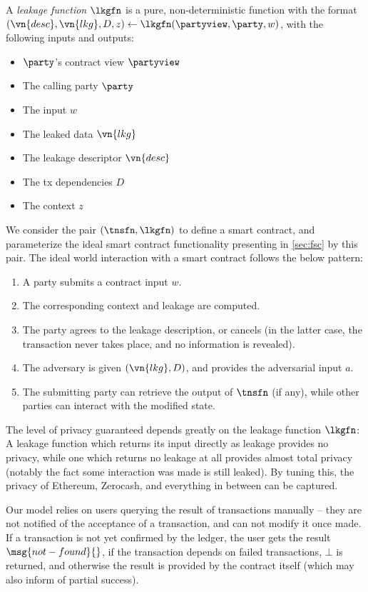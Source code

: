 A \emph{leakage function} $\lkgfn$ is a pure, non-deterministic
function with the format $(\vn{desc}, \vn{lkg}, D, z) \gets
\lkgfn(\partyview,\party, w)$, with the following inputs and outputs:
\vspace{-1em}
\begin{multicols}{2}
\begin{itemize}
  \item $\party$'s contract view $\partyview$
  \item The calling party $\party$
  \item The input $w$
  \item The leaked data $\vn{lkg}$
  \item The leakage descriptor $\vn{desc}$
  \item The tx dependencies $D$
  \item The context $z$
\end{itemize}
\end{multicols}
\vspace{-1em}

We consider the pair $(\tnsfn, \lkgfn)$ to define a smart contract, and
  parameterize the ideal smart contract functionality presenting in
  \autoref{sec:fsc} by this pair. The ideal
world interaction with a smart contract follows the below pattern:

\begin{enumerate}
  \item A party submits a contract input $w$.
  \item The corresponding context and leakage are computed.
  \item The party agrees to the leakage description, or cancels (in the latter
    case, the transaction never takes place, and no information is revealed).
  \item The adversary is given $(\vn{lkg}, D)$, and provides the adversarial
    input $a$.
  \item The submitting party can retrieve the output of
    $\tnsfn$ (if any), while other parties can interact with the modified state.
\end{enumerate}

The level of privacy guaranteed depends greatly on the leakage function
$\lkgfn$: A leakage function which returns its input directly as leakage
provides no privacy, while one which returns no leakage at all provides almost total
privacy (notably the fact some interaction was made is still leaked). By tuning
this, the privacy of Ethereum, Zerocash, and everything in between can be
captured.

Our model relies on users querying the result of transactions manually -- they
are not notified of the acceptance of a transaction, and can not modify it once
made. If a transaction is not yet confirmed by the ledger, the user gets the
result $\msg{not-found}{}$, if the transaction depends on failed transactions,
$\bot$ is returned, and otherwise the result is provided by the
contract itself (which may also inform of partial success).

